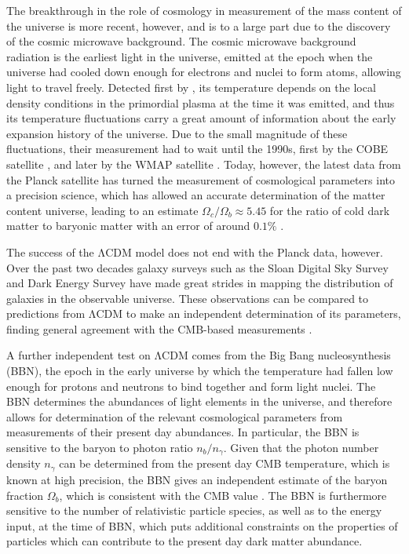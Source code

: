 \documentclass[b5paper, 10pt, twoside]{book}
\begin{document}
The breakthrough in the role of cosmology in measurement of the mass content of the universe is more recent, however, and is to a large part due to the discovery of the cosmic microwave background. The cosmic microwave background radiation is the earliest light in the universe, emitted at the epoch when the universe had cooled down enough for electrons and nuclei to form atoms, allowing light to travel freely. Detected first by \textcite{PenziasWilson1965}, its temperature depends on the local density conditions in the primordial plasma at the time it was emitted, and thus its temperature fluctuations carry a great amount of information about the early expansion history of the universe. Due to the small magnitude of these fluctuations, their measurement had to wait until the 1990s, first by the COBE satellite \parencite{BennettEtAl1996}, and later by the WMAP satellite \parencite{BennettEtAl2013}. Today, however, the latest data from the Planck satellite has turned the measurement of cosmological parameters into a precision science, which has allowed an accurate determination of the matter content universe, leading to an estimate $\Omega_c/\Omega_b\approx 5.45$ for the ratio of cold dark matter to baryonic matter with an error of around $0.1\%$ \parencite{Planck2018}.

The success of the ΛCDM model does not end with the Planck data, however. Over the past two decades galaxy surveys such as the Sloan Digital Sky Survey \parencite{SDSSIV2022} and Dark Energy Survey \parencite{DES2018} have made great strides in mapping the distribution of galaxies in the observable universe. These observations can be compared to predictions from ΛCDM to make an independent determination of its parameters, finding general agreement with the CMB-based measurements \parencite{eBOSS2021}.

A further independent test on ΛCDM comes from the Big Bang nucleosynthesis (BBN), the epoch in the early universe by which the temperature had fallen low enough for protons and neutrons to bind together and form light nuclei. The BBN determines the abundances of light elements in the universe, and therefore allows for determination of the relevant cosmological parameters from measurements of their present day abundances. In particular, the BBN is sensitive to the baryon to photon ratio $n_b/n_\gamma$. Given that the photon number density $n_\gamma$ can be determined from the present day CMB temperature, which is known at high precision, the BBN gives an independent estimate of the baryon fraction $\Omega_b$, which is consistent with the CMB value \parencite{FieldsEtAl2020}. The BBN is furthermore sensitive to the number of relativistic particle species, as well as to the energy input, at the time of BBN, which puts additional constraints on the properties of particles which can contribute to the present day dark matter abundance.
\end{document}
